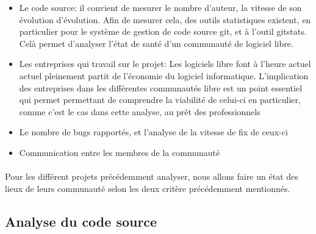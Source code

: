 \begin{itemize}

  \item {Le code source: il convient de mesurer le nombre d'auteur,
  la vitesse de son évolution
    d'évolution. Afin de mesurer cela, des outils statistiques
    existent, en particulier pour le système de gestion de code
    source git, et à l'outil gitstats. Celà permet
    d'analyser l'état de santé d'un communauté de logiciel libre.}

  \item {Les entreprises qui travail sur le projet: Les logiciels libre
    font à l'heure actuel actuel pleinement partit de l'économie
    du logiciel informatique. L'implication des entreprises dans les
    différentes communautés libre est un point essentiel qui permet
    permettant de comprendre la viabilité de celui-ci en particulier,
    comme c'est le cas dans cette analyse, au prêt des professionnels}

  \item {Le nombre de bugs rapportés, et l'analyse de la vitesse de fix
    de ceux-ci}

  \item {Communication entre les membres de la communauté}

\end{itemize}

\paragraph{}

Pour les différent projets précédemment analyser, nous allons
faire un état des lieux de leurs communauté selon les deux critère
précédemment mentionnés.

\subsection {Analyse du code source}

